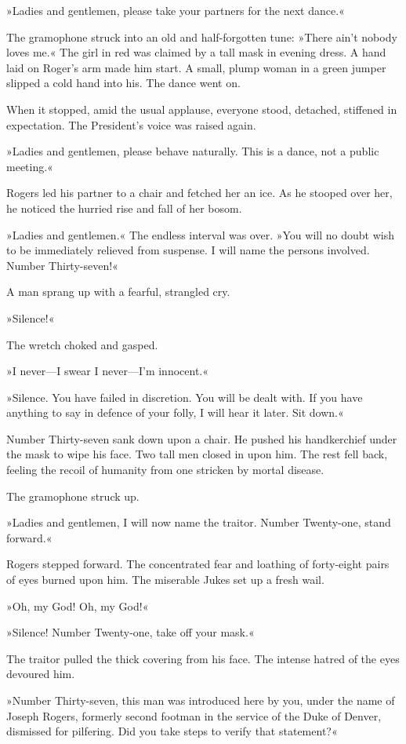 »Ladies and gentlemen, please take your partners for the next dance.«

The gramophone struck into an old and half-forgotten tune: »There ain't nobody loves me.« The girl in red was claimed by a tall mask in evening dress. A hand laid on Roger's arm made him start. A small, plump woman in a green jumper slipped a cold hand into his. The dance went on.

When it stopped, amid the usual applause, everyone stood, detached, stiffened in expectation. The President's voice was raised again.

»Ladies and gentlemen, please behave naturally. This is a dance, not a public meeting.«

Rogers led his partner to a chair and fetched her an ice. As he stooped over her, he noticed the hurried rise and fall of her bosom.

»Ladies and gentlemen.« The endless interval was over. »You will no doubt wish to be immediately relieved from suspense. I will name the persons involved. Number Thirty-seven!«

A man sprang up with a fearful, strangled cry.

»Silence!«

The wretch choked and gasped.

»I never—I swear I never—I'm innocent.«

»Silence. You have failed in discretion. You will be dealt with. If you have anything to say in defence of your folly, I will hear it later. Sit down.«

Number Thirty-seven sank down upon a chair. He pushed his handkerchief under the mask to wipe his face. Two tall men closed in upon him. The rest fell back, feeling the recoil of humanity from one stricken by mortal disease.

The gramophone struck up.

»Ladies and gentlemen, I will now name the traitor. Number Twenty-one, stand forward.«

Rogers stepped forward. The concentrated fear and loathing of forty-eight pairs of eyes burned upon him. The miserable Jukes set up a fresh wail.

»Oh, my God! Oh, my God!«

»Silence! Number Twenty-one, take off your mask.«

The traitor pulled the thick covering from his face. The intense hatred of the eyes devoured him.

»Number Thirty-seven, this man was introduced here by you, under the name of Joseph Rogers, formerly second footman in the service of the Duke of Denver, dismissed for pilfering. Did you take steps to verify that statement?«

